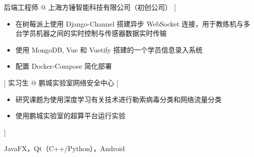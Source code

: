 \documentclass[zh]{resume}
\begin{document}
\begin{experiences}
	{后端工程师 @ 上海方锤智能科技有限公司（初创公司）}%
	[\begin{itemize}
		\item 在树莓派上使用 Django-Channel 搭建异步 WebSocket 连接，用于教练机与多台学员机器之间的实时控制与传感器数据实时传输
		\item 使用 MongoDB, Vue 和 Vuetify 搭建的一个学员信息录入系统
		\item 配置 Docker-Compose 简化部署
	\end{itemize}]
	\separator{0.5ex}
	{实习生 @ 鹏城实验室网络安全中心}%
	[\begin{itemize}
		\item 研究课题为使用深度学习有关技术进行勒索病毒分类和网络流量分类
		\item 使用鹏城实验室的超算平台运行实验
	\end{itemize}]
\end{experiences}

\begin{competences}
	 {
		JavaFX，Qt（C++/Python），Android
	}
\end{competences}
\end{document}

